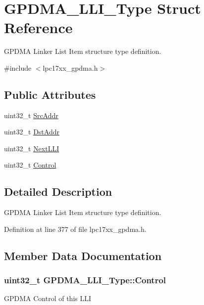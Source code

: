 \hypertarget{struct_g_p_d_m_a___l_l_i___type}{\section{\-G\-P\-D\-M\-A\-\_\-\-L\-L\-I\-\_\-\-Type \-Struct \-Reference}
\label{struct_g_p_d_m_a___l_l_i___type}
}


\-G\-P\-D\-M\-A \-Linker \-List \-Item structure type definition.  




{\ttfamily \#include $<$lpc17xx\-\_\-gpdma.\-h$>$}

\subsection*{\-Public \-Attributes}
\begin{DoxyCompactItemize}
\item 
uint32\-\_\-t \hyperlink{struct_g_p_d_m_a___l_l_i___type_a9c581d9916dfc4f2cd74981faf167225}{\-Src\-Addr}
\item 
uint32\-\_\-t \hyperlink{struct_g_p_d_m_a___l_l_i___type_adf0fc4f04316deba134de095b80afce5}{\-Dst\-Addr}
\item 
uint32\-\_\-t \hyperlink{struct_g_p_d_m_a___l_l_i___type_ad21cd897bd9cb7fbd1e20df097a903aa}{\-Next\-L\-L\-I}
\item 
uint32\-\_\-t \hyperlink{struct_g_p_d_m_a___l_l_i___type_adde4a3a034f45afd5e85a1429b8bcc09}{\-Control}
\end{DoxyCompactItemize}


\subsection{\-Detailed \-Description}
\-G\-P\-D\-M\-A \-Linker \-List \-Item structure type definition. 

\-Definition at line 377 of file lpc17xx\-\_\-gpdma.\-h.



\subsection{\-Member \-Data \-Documentation}
\hypertarget{struct_g_p_d_m_a___l_l_i___type_adde4a3a034f45afd5e85a1429b8bcc09}{
\subsubsection[{\-Control}]{\setlength{\rightskip}{0pt plus 5cm}uint32\-\_\-t {\bf \-G\-P\-D\-M\-A\-\_\-\-L\-L\-I\-\_\-\-Type\-::\-Control}}}\label{struct_g_p_d_m_a___l_l_i___type_adde4a3a034f45afd5e85a1429b8bcc09}
\-G\-P\-D\-M\-A \-Control of this \-L\-L\-I 

